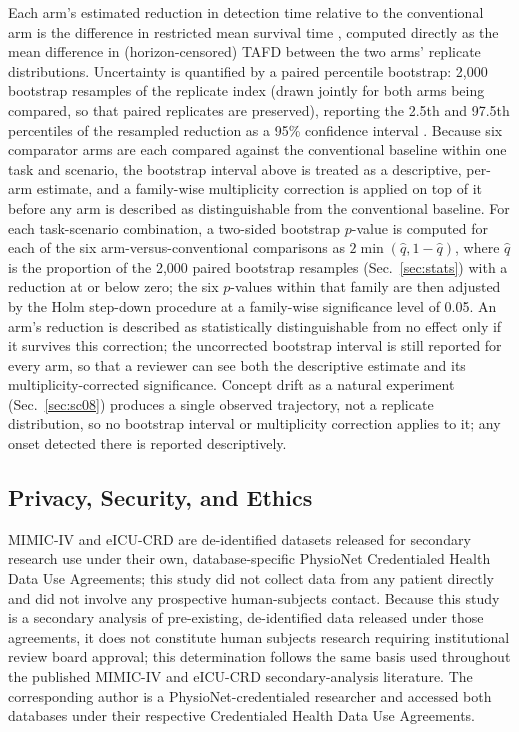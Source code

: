 \documentclass[preprintsapa,article,submit,oneauthor]{Definitions/mdpi}
\begin{document}
Each arm's estimated reduction in detection time relative to the conventional arm is the difference in restricted mean survival time \citep{royston2013}, computed directly as the mean difference in (horizon-censored) TAFD between the two arms' replicate distributions. Uncertainty is quantified by a paired percentile bootstrap: 2{,}000 bootstrap resamples of the replicate index (drawn jointly for both arms being compared, so that paired replicates are preserved), reporting the 2.5th and 97.5th percentiles of the resampled reduction as a 95\% confidence interval \citep{efron1979}. Because six comparator arms are each compared against the conventional baseline within one task and scenario, the bootstrap interval above is treated as a descriptive, per-arm estimate, and a family-wise multiplicity correction is applied on top of it before any arm is described as distinguishable from the conventional baseline. For each task-scenario combination, a two-sided bootstrap $p$-value is computed for each of the six arm-versus-conventional comparisons as $2 \min(\hat{q}, 1-\hat{q})$, where $\hat{q}$ is the proportion of the 2{,}000 paired bootstrap resamples (Sec.~\ref{sec:stats}) with a reduction at or below zero; the six $p$-values within that family are then adjusted by the Holm step-down procedure \citep{holm1979} at a family-wise significance level of 0.05. An arm's reduction is described as statistically distinguishable from no effect only if it survives this correction; the uncorrected bootstrap interval is still reported for every arm, so that a reviewer can see both the descriptive estimate and its multiplicity-corrected significance. Concept drift as a natural experiment (Sec.~\ref{sec:sc08}) produces a single observed trajectory, not a replicate distribution, so no bootstrap interval or multiplicity correction applies to it; any onset detected there is reported descriptively.

\subsection{Privacy, Security, and Ethics}

MIMIC-IV and eICU-CRD are de-identified datasets released for secondary research use under their own, database-specific PhysioNet Credentialed Health Data Use Agreements; this study did not collect data from any patient directly and did not involve any prospective human-subjects contact. Because this study is a secondary analysis of pre-existing, de-identified data released under those agreements, it does not constitute human subjects research requiring institutional review board approval; this determination follows the same basis used throughout the published MIMIC-IV and eICU-CRD secondary-analysis literature. The corresponding author is a PhysioNet-credentialed researcher and accessed both databases under their respective Credentialed Health Data Use Agreements.
\end{document}
